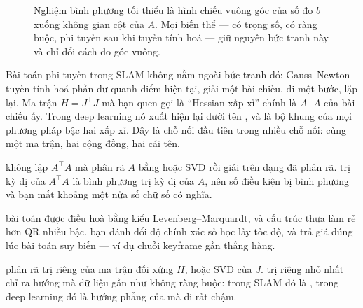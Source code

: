 \documentclass[../../../deep_learning.tex]{subfiles}
\begin{document}
\begin{figure}[H]\centering
{}
\caption{Nghiệm bình phương tối thiểu là hình chiếu vuông góc của số đo \(b\) xuống không gian cột của \(A\). Mọi biến thể --- có trọng số, có ràng buộc, phi tuyến sau khi tuyến tính hoá --- giữ nguyên bức tranh này và chỉ đổi cách đo góc vuông.}
\label{fig:chieu-lsq}
\end{figure}

Bài toán phi tuyến trong SLAM không nằm ngoài bức tranh đó: Gauss--Newton tuyến tính hoá phần dư quanh điểm hiện tại, giải một bài chiếu, đi một bước, lặp lại. Ma trận \(H = J^\top J\) mà bạn quen gọi là ``Hessian xấp xỉ'' chính là \(A^\top A\) của bài chiếu ấy. Trong deep learning nó xuất hiện lại dưới tên , và là bộ khung của mọi phương pháp bậc hai xấp xỉ. Đây là chỗ nối đầu tiên trong nhiều chỗ nối: cùng một ma trận, hai cộng đồng, hai cái tên.

\begin{mach}
\item {} \gp không lập \(A^\top A\) mà phân rã \(A\) bằng  hoặc SVD rồi giải trên dạng đã phân rã. \hq trị kỳ dị của \(A^\top A\) là bình phương trị kỳ dị của \(A\), nên số điều kiện bị bình phương và bạn mất khoảng một nửa số chữ số có nghĩa.
\item {} \gd bài toán được điều hoà bằng  kiểu Levenberg--Marquardt, và cấu trúc thưa làm  rẻ hơn QR nhiều bậc. \gia bạn đánh đổi độ chính xác số học lấy tốc độ, và trả giá đúng lúc bài toán suy biến --- ví dụ chuỗi keyframe gần thẳng hàng.
\item {} \gp phân rã trị riêng của ma trận đối xứng \(H\), hoặc SVD của \(J\). \hq trị riêng nhỏ nhất chỉ ra hướng mà dữ liệu gần như không ràng buộc: trong SLAM đó là , trong deep learning đó là hướng phẳng của  mà  đi rất chậm.
\end{mach}
\end{document}
